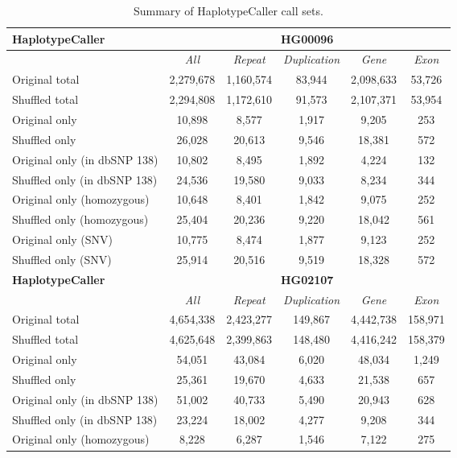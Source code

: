 \begin{table}[htb]
\caption{Summary of HaplotypeCaller call sets. }
\begin{center}
\begin{tabular}{|l|c||c|c|c|c|}
\hline
{\bf HaplotypeCaller} & \multicolumn{5}{|c|}{\bf HG00096} \\
\hline
\cline{2-6}
{\bf} & {\it All} & {\it Repeat} & {\it Duplication} & {\it Gene} & {\it Exon} \\
\hline
Original total & 2,279,678 & 1,160,574 & 83,944 & 2,098,633 & 53,726 \\
\hline
Shuffled total & 2,294,808 & 1,172,610 & 91,573 & 2,107,371 & 53,954 \\
\hline
Original only & 10,898 & 8,577 & 1,917 & 9,205 & 253 \\
\hline
Shuffled only & 26,028 & 20,613 & 9,546 & 18,381 & 572 \\
\hline
Original only (in dbSNP 138) & 10,802 & 8,495 & 1,892 & 4,224 & 132 \\
\hline
Shuffled only (in dbSNP 138) & 24,536 & 19,580 & 9,033 & 8,234 & 344 \\
\hline
Original only (homozygous) & 10,648 & 8,401 & 1,842 & 9,075 & 252 \\
\hline
Shuffled only (homozygous) & 25,404 & 20,236 & 9,220 & 18,042 & 561 \\
\hline
Original only (SNV) & 10,775 & 8,474 & 1,877 & 9,123 & 252 \\
\hline
Shuffled only (SNV) & 25,914 & 20,516 & 9,519 & 18,328 & 572 \\ 
\hline
\hline
{\bf HaplotypeCaller} & \multicolumn{5}{|c|}{\bf HG02107} \\
\hline
\cline{2-6}
{\bf} & {\it All} & {\it Repeat} & {\it Duplication} & {\it Gene} & {\it Exon} \\
\hline
Original total & 4,654,338 & 2,423,277 & 149,867 & 4,442,738 & 158,971 \\
\hline
Shuffled total & 4,625,648 & 2,399,863 & 148,480 & 4,416,242 & 158,379 \\
\hline
Original only & 54,051 & 43,084 & 6,020 & 48,034 & 1,249 \\
\hline
Shuffled only & 25,361 & 19,670 & 4,633 & 21,538 & 657 \\
\hline
Original only (in dbSNP 138) & 51,002 & 40,733 & 5,490 & 20,943 & 628 \\
\hline
Shuffled only (in dbSNP 138) & 23,224 & 18,002 & 4,277 & 9,208 & 344 \\
\hline
Original only (homozygous) & 8,228 & 6,287 & 1,546 & 7,122 & 275 \\

\end{tabular}
\end{center}
\end{table}
